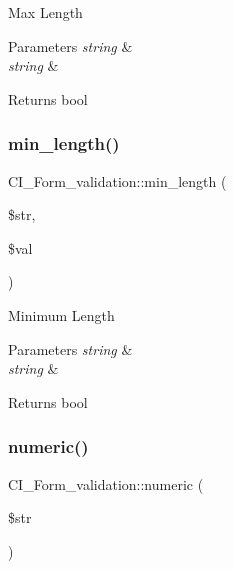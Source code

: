 Max Length


\begin{DoxyParams}{Parameters}
{\em string} & \\
\hline
{\em string} & \\
\hline
\end{DoxyParams}
\begin{DoxyReturn}{Returns}
bool 
\end{DoxyReturn}
\mbox{\label{class_c_i___form__validation_af13a4f0757306ebe7355b95fb5b4bcd7}} 
\subsubsection{\texorpdfstring{min\+\_\+length()}{min\_length()}}
{\footnotesize\ttfamily C\+I\+\_\+\+Form\+\_\+validation\+::min\+\_\+length (\begin{DoxyParamCaption}\item[{}]{\$str,  }\item[{}]{\$val }\end{DoxyParamCaption})}

Minimum Length


\begin{DoxyParams}{Parameters}
{\em string} & \\
\hline
{\em string} & \\
\hline
\end{DoxyParams}
\begin{DoxyReturn}{Returns}
bool 
\end{DoxyReturn}
\mbox{\label{class_c_i___form__validation_a6935c4cbcdd7d55ac95d66a8a40e14bd}} 
\subsubsection{\texorpdfstring{numeric()}{numeric()}}
{\footnotesize\ttfamily C\+I\+\_\+\+Form\+\_\+validation\+::numeric (\begin{DoxyParamCaption}\item[{}]{\$str }\end{DoxyParamCaption})}

